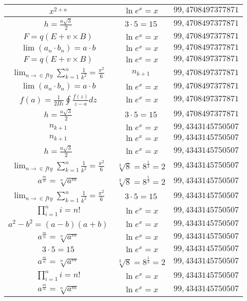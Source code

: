 \documentclass{article}
\begin{document}
\begin{flushleft}
\begin{longtable}{|c|c|c|}
$x^{2+a}$ & $\ln e^x=x$ & $99,4708497377871$ \\ \hline 
$h=\frac{a\sqrt{3}}{2}$ & $3\cdot 5=15$ & $99,4708497377871$ \\ \hline 
$F=q\left(E+v\times B\right)$ & $\ln e^x=x$ & $99,4708497377871$ \\ \hline 
$\lim\left(a_n\cdot b_n\right)=a\cdot b$ & $\ln e^x=x$ & $99,4708497377871$ \\ \hline 
$F=q\left(E+v\times B\right)$ & $\ln e^x=x$ & $99,4708497377871$ \\ \hline 
$\lim_{n\to\in fty}\sum_{k=1}^n\frac{1}{k^2}=\frac{\pi^2}{6}$ & $n_{k+1}$ & $99,4708497377871$ \\ \hline 
$\lim\left(a_n\cdot b_n\right)=a\cdot b$ & $\ln e^x=x$ & $99,4708497377871$ \\ \hline 
$f\left(a\right)=\frac{1}{2\Pi i}\oint\frac{f\left(z\right)}{z-a}dz$ & $\ln e^x=x$ & $99,4708497377871$ \\ \hline 
$h=\frac{a\sqrt{3}}{2}$ & $3\cdot 5=15$ & $99,4708497377871$ \\ \hline 
$n_{k+1}$ & $\ln e^x=x$ & $99,4343145750507$ \\ \hline 
$n_{k+1}$ & $\ln e^x=x$ & $99,4343145750507$ \\ \hline 
$h=\frac{a\sqrt{3}}{2}$ & $\ln e^x=x$ & $99,4343145750507$ \\ \hline 
$\lim_{n\to\in fty}\sum_{k=1}^n\frac{1}{k^2}=\frac{\pi^2}{6}$ & $\sqrt[3]{8}=8^{\frac{1}{3}}=2$ & $99,4343145750507$ \\ \hline 
$a^{\frac{m}{n}}=\sqrt[n]{a^{m}}$ & $\sqrt[3]{8}=8^{\frac{1}{3}}=2$ & $99,4343145750507$ \\ \hline 
$\lim_{n\to\in fty}\sum_{k=1}^n\frac{1}{k^2}=\frac{\pi^2}{6}$ & $3\cdot 5=15$ & $99,4343145750507$ \\ \hline 
$\prod_{i=1}^ni=n!$ & $\ln e^x=x$ & $99,4343145750507$ \\ \hline 
$a^2-b^2=(a-b)(a+b)$ & $\ln e^x=x$ & $99,4343145750507$ \\ \hline 
$a^{\frac{m}{n}}=\sqrt[n]{a^{m}}$ & $\ln e^x=x$ & $99,4343145750507$ \\ \hline 
$3\cdot 5=15$ & $\ln e^x=x$ & $99,4343145750507$ \\ \hline 
$a^{\frac{m}{n}}=\sqrt[n]{a^{m}}$ & $\sqrt[3]{8}=8^{\frac{1}{3}}=2$ & $99,4343145750507$ \\ \hline 
$\prod_{i=1}^ni=n!$ & $\ln e^x=x$ & $99,4343145750507$ \\ \hline 
$a^{\frac{m}{n}}=\sqrt[n]{a^{m}}$ & $\ln e^x=x$ & $99,4343145750507$ \\ \hline 

\end{longtable}
\end{flushleft}
\end{document}
